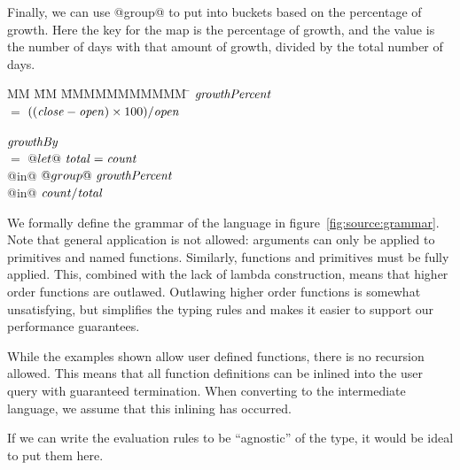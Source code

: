 Finally, we can use @group@ to put into buckets based on the percentage of growth.
Here the key for the map is the percentage of growth, and the value is the number of days with that amount of growth, divided by the total number of days.
\begin{tabbing}
MM \= MM \= MMMMMMMMMMM \= \kill
$\mathit{growthPercent}$                                        \\
 \> $=$  \> $((\mathit{close}-\mathit{open}) \times 100 ) / \mathit{open}$  \\
                                                            \\
$\mathit{growthBy}$                                             \\
 \> $=$  \> $@let@~\mathit{total} = \mathit{count}$                 \\
 \> @in@ \> $@group@~\mathit{growthPercent}$                    \\
 \> @in@ \> $\mathit{count} / \mathit{total}$                    \\
\end{tabbing}



We formally define the grammar of the language in figure~\ref{fig:source:grammar}.
Note that general application is not allowed: arguments can only be applied to primitives and named functions.
Similarly, functions and primitives must be fully applied.
This, combined with the lack of lambda construction, means that higher order functions are outlawed.
Outlawing higher order functions is somewhat unsatisfying, but simplifies the typing rules and makes it easier to support our performance guarantees.

While the examples shown allow user defined functions, there is no recursion allowed.
This means that all function definitions can be inlined into the user query with guaranteed termination.
When converting to the intermediate language, we assume that this inlining has occurred.

If we can write the evaluation rules to be ``agnostic'' of the type, it would be ideal to put them here.




